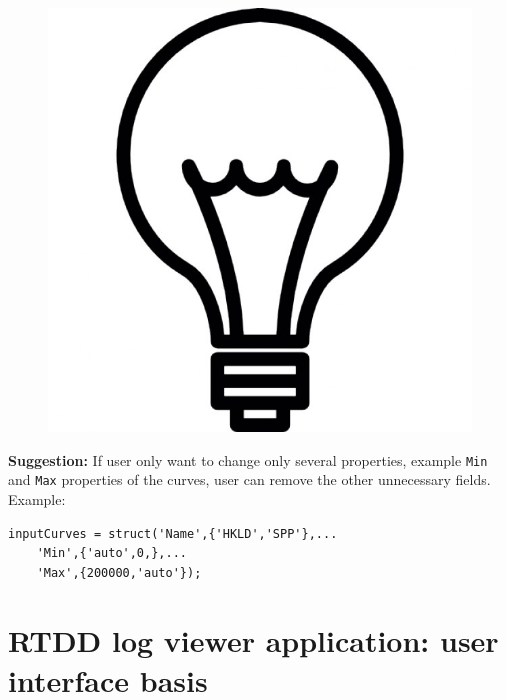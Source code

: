 \documentclass[12pt,a4paper,oneside]{report}
\begin{document}
\pagebreak
\begin{figure}
\includegraphics[scale=0.03]{light_bulb.jpg}
\end{figure}
\noindent\textbf{Suggestion:} If user only want to change only several properties, example \texttt{Min} and \texttt{Max} properties of the curves, user can remove the other unnecessary fields. Example:
\begin{lstlisting}[style=Matlab-editor]
inputCurves = struct('Name',{'HKLD','SPP'},...
    'Min',{'auto',0,},...
    'Max',{200000,'auto'});
\end{lstlisting}

\chapter{RTDD log viewer application: user interface basis}
\end{document}
